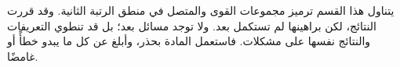 \documentclass[../../../include/open-logic-chapter]{subfiles}
\begin{document}

\begin{editorial}
يتناول هذا القسم ترميز مجموعات القوى والمتصل في منطق الرتبة الثانية.
وقد قررت النتائج، لكن براهينها لم تستكمل بعد. ولا توجد مسائل بعد؛ بل قد
تنطوي التعريفات والنتائج نفسها على مشكلات. فاستعمل المادة بحذر، وأبلغ عن
كل ما يبدو خطأً أو غامضًا.
\end{editorial}





\OLEndChapterHook
\end{document}
